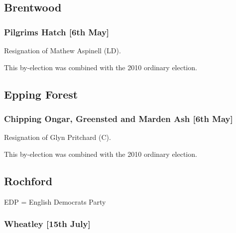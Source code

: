 \begin{resultsiii}
\subsection{Brentwood}

\subsubsection*{Pilgrims Hatch \hspace*{\fill}\nolinebreak[1]%
\enspace\hspace*{\fill}
[6th May]}


Resignation of Mathew Aspinell (LD).

This by-election was combined with the 2010 ordinary election.

\subsection{Epping Forest}

\subsubsection*{Chipping Ongar, Greensted and Marden Ash \hspace*{\fill}\nolinebreak[1]%
\enspace\hspace*{\fill}
[6th May]}


Resignation of Glyn Pritchard (C).

This by-election was combined with the 2010 ordinary election.

\subsection{Rochford}

EDP = English Democrats Party

\subsubsection*{Wheatley \hspace*{\fill}\nolinebreak[1]%
\enspace\hspace*{\fill}
[15th July]}


\end{resultsiii}
